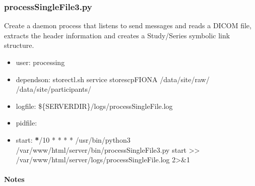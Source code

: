 \documentclass[letterpaper,10pt,english]{sphinxmanual}
\begin{document}
\subsubsection{processSingleFile3.py}
\label{\detokenize{Architecture/scripts/processSingleFile3:processsinglefile3-py}}\label{\detokenize{Architecture/scripts/processSingleFile3::doc}}
\sphinxAtStartPar
Create a daemon process that listens to send messages and reads a DICOM file,
extracts the header information and creates a Study/Series symbolic link structure.
\begin{itemize}
\item {} 
\sphinxAtStartPar
user: processing

\item {} 
\sphinxAtStartPar
depends\sphinxhyphen{}on:
\sphinxhyphen{} storectl.sh service storescpFIONA
\sphinxhyphen{} /data/site/raw/
\sphinxhyphen{} /data/site/participants/

\item {} 
\sphinxAtStartPar
log\sphinxhyphen{}file:
\sphinxhyphen{} \$\{SERVERDIR\}/logs/processSingleFile.log

\item {} 
\sphinxAtStartPar
pid\sphinxhyphen{}file:

\item {} 
\sphinxAtStartPar
start:
{\color{red}\bfseries{}*}/10 * * * * /usr/bin/python3 /var/www/html/server/bin/processSingleFile3.py start \textgreater{}\textgreater{} /var/www/html/server/logs/processSingleFile.log 2\textgreater{}\&1

\end{itemize}


\paragraph{Notes}
\label{\detokenize{Architecture/scripts/processSingleFile3:notes}}\begin{description}
\sphinxAtStartPar
{}

\end{description}

\sphinxstepscope
\end{document}
